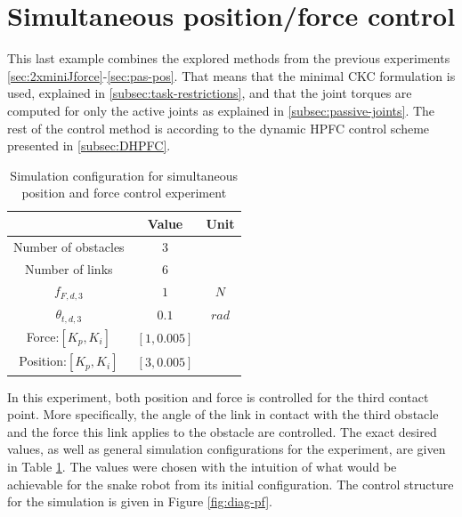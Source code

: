 \section{Simultaneous position/force control}\label{sec:pos-force-control-exp}

This last example combines the explored methods from the previous experiments \ref{sec:2xminiJforce}-\ref{sec:pas-pos}. That means that the minimal CKC formulation is used, explained in \ref{subsec:task-restrictions}, and that the joint torques are computed for only the active joints as explained in \ref{subsec:passive-joints}. The rest of the control method is according to the dynamic HPFC control scheme presented in \ref{subsec:DHPFC}.

\begin{table}[h!]
    \centering
    \begin{tabular}{|c|c|c|}
        \hline
        & \textbf{Value} & \textbf{Unit}\\
        \hline \hline
        Number of obstacles & $3$ & \\
        Number of links & $6$ & \\
        $f_{F,d,3}$ & $1$ & $N$ \\
        $\theta_{t,d,3}$ & $0.1$ & $rad$ \\
        Force:$[K_{p}, K_{i}]$ & $[1, 0.005]$ &\\
        Position:$[K_{p}, K_{i}]$ & $[3, 0.005]$ &\\
        \hline
    \end{tabular}
    \caption{Simulation configuration for simultaneous position and force control experiment}
    \label{tab:p+f}
\end{table}

In this experiment, both position and force is controlled for the third contact point. More specifically, the angle of the link in contact with the third obstacle and the force this link applies to the obstacle are controlled. The exact desired values, as well as general simulation configurations for the experiment, are given in Table \ref{tab:p+f}. The values were chosen with the intuition of what would be achievable for the snake robot from its initial configuration. The control structure for the simulation is given in Figure \ref{fig:diag-pf}.

